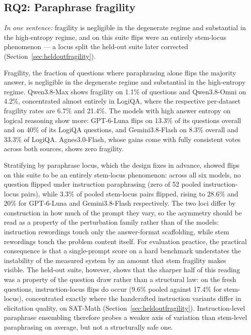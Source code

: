 \subsection{RQ2: Paraphrase fragility}
\label{app:rq2}
\label{sec:rq2}

\emph{In one sentence:} fragility is negligible in the degenerate regime and substantial in the high-entropy regime, and on this suite flips were an entirely stem-locus phenomenon --- a locus split the held-out suite later corrected (Section~\ref{sec:heldoutfragility}).

Fragility, the fraction of questions where paraphrasing alone flips the majority answer, is negligible in the degenerate regime and substantial in the high-entropy regime. Qwen3.8-Max shows fragility on 1.1\% of questions and Qwen3.8-Omni on 4.2\%, concentrated almost entirely in LogiQA, where the respective per-dataset fragility rates are 6.7\% and 21.4\%. The models with high answer entropy on logical reasoning show more: GPT-6-Luna flips on 13.3\% of its questions overall and on 40\% of its LogiQA questions, and Gemini3.8-Flash on 8.3\% overall and 33.3\% of LogiQA. Agnes3.0-Flash, whose gains come with fully consistent votes across both sources, shows zero fragility.

Stratifying by paraphrase locus, which the design fixes in advance, showed flips on this suite to be an entirely stem-locus phenomenon: across all six models, no question flipped under instruction paraphrasing (zero of 52 pooled instruction-locus pairs), while 3.3\% of pooled stem-locus pairs flipped, rising to 28.6\% and 20\% for GPT-6-Luna and Gemini3.8-Flash respectively. The two loci differ by construction in how much of the prompt they vary, so the asymmetry should be read as a property of the perturbation family rather than of the models: instruction rewordings touch only the answer-format scaffolding, while stem rewordings touch the problem content itself. For evaluation practice, the practical consequence is that a single-prompt score on a hard benchmark understates the instability of the measured system by an amount that stem fragility makes visible. The held-out suite, however, shows that the sharper half of this reading was a property of the question draw rather than a structural law: on the fresh questions, instruction-locus flips do occur (9.6\% pooled against 17.4\% for stem-locus), concentrated exactly where the handcrafted instruction variants differ in elicitation quality, on SAT-Math (Section~\ref{sec:heldoutfragility}). Instruction-level paraphrase ensembling therefore probes a weaker axis of variation than stem-level paraphrasing on average, but not a structurally safe one.

